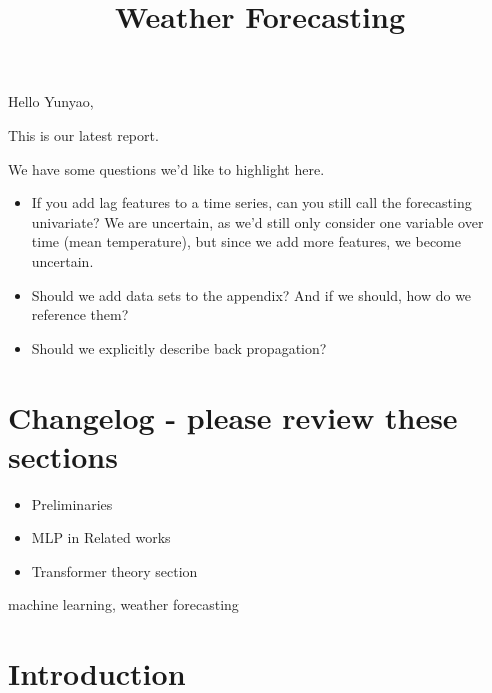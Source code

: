 


Hello Yunyao,

This is our latest report.

We have some questions we'd like to highlight here.

\begin{itemize}
    \item If you add lag features to a time series, can you still call the forecasting univariate? We are uncertain, as we'd still only consider one variable over time (mean temperature), but since we add more features, we become uncertain.
    \item Should we add data sets to the appendix? And if we should, how do we reference them?
    \item Should we explicitly describe back propagation?
\end{itemize}

\section{Changelog - please review these sections}
\begin{itemize}
    \item Preliminaries
    \item MLP in Related works
    \item Transformer theory section
\end{itemize}

\newpage

\title{Weather Forecasting}
\author{
    \and
    \and
    \and
}

\maketitle

\begin{abstract}
\end{abstract}

\begin{IEEEkeywords}
machine learning, weather forecasting
\end{IEEEkeywords}

\section{Introduction}


